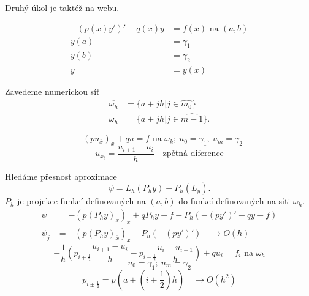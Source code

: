 	Druhý úkol je taktéž na \href{http://geraldine.fjfi.cvut.cz/~oberhuber/data/vyuka/num/dcv2.pdf}{webu}.
	
	\begin{align*}
		-(p(x) y')' + q(x)y &= f(x) \text{ na } (a,b) \\
		y(a) &= \gamma_1 \\
		y(b) &= \gamma_2 \\
		y &= y(x)
	\end{align*}
	
	Zavedeme numerickou síť
	\begin{align*}
		\overline{\omega_h} &= \{ a + jh| j \in \widehat{m_0}\} \\
		\omega_h &= \{ a + jh| j \in \widehat{m-1}\}.
	\end{align*}
	
	$$ -(pu_{\overline{x}})_x + qu =f \text{ na } \omega_k;\ u_0 = \gamma_1,\ u_m = \gamma_2 $$
	$$ u_{\overline{x_i}} = \frac{u_{i+1} - u_i}{h} \quad \text{zpětná diference} $$
	
	Hledáme přesnost aproximace
	$$ \psi = L_h(P_h y ) - P_h(L_y).$$
	$P_h$ je projekce funkcí definovaných na $(a, b)$ do funkcí definovaných na síti $\overline{\omega_h}$.
	\begin{align*}
		\psi &= -(p(P_h y)_{\overline{x}})_x + qP_hy - f - P_h(-(py')' + qy - f) \\
		\psi_j &= -(p(P_h y)_{\overline{x}})_x - P_h(-(py')') \quad \rightarrow O(h)
	\end{align*}
	$$ - \frac{1}{h} \left( p_{i + \frac{1}{2}} \frac{u_{i+1} - u_i}{h} - p_{i - \frac{1}{2}}
	\frac{u_i - u_{i-1}}{h} \right)  + qu_i = f_i \text{ na } \omega_h$$
	$$ u_0 = \gamma_1;\ u_m = \gamma_2 $$
	$$ p_{i \pm \frac{1}{2}} = p\left(a + \left(i \pm \frac{1}{2}\right)h \right) \quad \rightarrow O(h^2)$$
	

